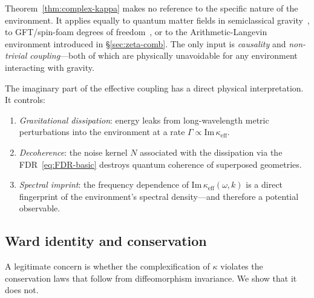 \documentclass[12pt,a4paper]{article}
\begin{document}
\begin{remark}[Generality]
Theorem~\ref{thm:complex-kappa} makes no reference to the specific
nature of the environment.  It applies equally to quantum matter
fields in semiclassical gravity~\cite{HuVerdaguer2008}, to GFT/spin-foam
degrees of freedom~\cite{Oriti2012}, or to the Arithmetic-Langevin
environment introduced in \S\ref{sec:zeta-comb}.  The only input is
\emph{causality} and \emph{non-trivial coupling}---both of which are
physically unavoidable for any environment interacting with gravity.
\end{remark}

\begin{remark}
The imaginary part of the effective coupling has a direct physical
interpretation.  It controls:
\begin{enumerate}
  \item \emph{Gravitational dissipation}: energy leaks from
    long-wavelength metric perturbations into the environment at a
    rate $\Gamma\propto\mathrm{Im}\,\kappa_{\mathrm{eff}}$.
  \item \emph{Decoherence}: the noise kernel $N$ associated with the
    dissipation via the FDR~\eqref{eq:FDR-basic} destroys quantum
    coherence of superposed geometries.
  \item \emph{Spectral imprint}: the frequency dependence of
    $\mathrm{Im}\,\kappa_{\mathrm{eff}}(\omega,k)$ is a direct
    fingerprint of the environment's spectral density---and therefore
    a potential observable.
\end{enumerate}
\end{remark}

\subsection{Ward identity and conservation}\label{ssec:ward}

A legitimate concern is whether the complexification of $\kappa$
violates the conservation laws that follow from diffeomorphism
invariance.  We show that it does not.
\end{document}
